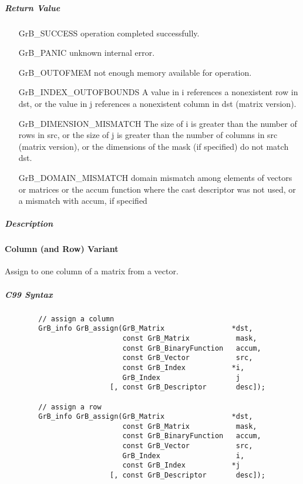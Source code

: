 \subparagraph{Return Value}


\begin{itemize}[leftmargin=2.1in]
\item[{\sf GrB\_SUCCESS}]      operation completed successfully.
\item[{\sf GrB\_PANIC}]        unknown internal error.
\item[{\sf GrB\_OUTOFMEM}]     not enough memory available for operation.
\item[{\sf GrB\_INDEX\_OUTOFBOUNDS}]
        A value in i references a nonexistent row in dst, or
        the value in j references a nonexistent column in dst (matrix version).
\item[{\sf GrB\_DIMENSION\_MISMATCH}] 
        The size of i is greater than the number of rows in src, or
        the size of j is greater than the number of columns in src (matrix version), or
        the dimensions of the mask (if specified) do not match dst.
\item[\sf GrB\_DOMAIN\_MISMATCH]  
       domain mismatch among elements of vectors or matrices or the accum function where the cast descriptor was not used, or a mismatch with {\sf accum}, if specified
\end{itemize}

\subparagraph{Description}

\paragraph{Column (and Row) Variant}

Assign to one column of a matrix from a vector.  

\subparagraph{C99 Syntax}

\begin{verbatim}
        // assign a column
        GrB_info GrB_assign(GrB_Matrix                *dst,
                            const GrB_Matrix           mask,
                            const GrB_BinaryFunction   accum,
                            const GrB_Vector           src,
                            const GrB_Index           *i,
                            GrB_Index                  j
                         [, const GrB_Descriptor       desc]); 

        // assign a row
        GrB_info GrB_assign(GrB_Matrix                *dst,
                            const GrB_Matrix           mask,
                            const GrB_BinaryFunction   accum,
                            const GrB_Vector           src,
                            GrB_Index                  i,
                            const GrB_Index           *j
                         [, const GrB_Descriptor       desc]); 
\end{verbatim}

